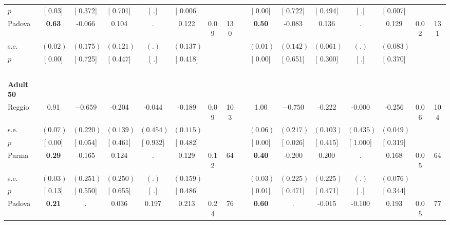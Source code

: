 \begin{longtable}{L{8em} c c c c c c c p{1em} c c c c c c c}
\quad \quad \quad \quad $ p$ & [     0.03] & [    0.372] & [    0.701] & [        .] & [    0.006] & & & & [     0.00] & [    0.722] & [    0.494] & [        .] & [    0.007] & &  \\[1em]
\quad \quad \quad Padova& \textbf{     0.63} &    -0.066 &     0.104 &         . &     0.122 &      0.09 &       130 & & \textbf{     0.50} &    -0.083 &     0.136 &         . &     0.129 &      0.02 &       131  \\*
\quad \quad \quad \quad s.e.& $ (     0.02)$ & $ (    0.175)$ & $ (    0.121)$ & $ (        .)$ & $ (    0.137)$ & & & & $ (     0.01)$ & $ (    0.142)$ & $ (    0.061)$ & $ (        .)$ & $ (    0.083)$ & &  \\*
\quad \quad \quad \quad $ p$ & [     0.00] & [    0.725] & [    0.447] & [        .] & [    0.418] & & & & [     0.00] & [    0.651] & [    0.300] & [        .] & [    0.370] & &  \\[1em]
~\\[1em]
\quad \quad \textbf{Adult 50} & & & & & & & & & & & & & & & \\* 
\quad \quad \quad Reggio& 0.91 & $ \mathbf{   -0.659}$ &    -0.204 &    -0.044 &    -0.189 &      0.09 &       103 & & 1.00 & $ \mathbf{   -0.750}$ &    -0.222 &    -0.000 &    -0.256 &      0.06 &       104  \\*
\quad \quad \quad \quad s.e.& $ (     0.07)$ & $ (    0.220)$ & $ (    0.139)$ & $ (    0.454)$ & $ (    0.115)$ & & & & $ (     0.06)$ & $ (    0.217)$ & $ (    0.103)$ & $ (    0.435)$ & $ (    0.049)$ & &  \\*
\quad \quad \quad \quad $ p$ & [     0.00] & [    0.054] & [    0.461] & [    0.932] & [    0.482] & & & & [     0.00] & [    0.026] & [    0.415] & [    1.000] & [    0.319] & &  \\[1em]
\quad \quad \quad Parma& \textbf{     0.29} &    -0.165 &     0.124 &         . &     0.129 &      0.12 &        64 & & \textbf{     0.40} &    -0.200 &     0.200 &         . &     0.168 &      0.05 &        64  \\*
\quad \quad \quad \quad s.e.& $ (     0.03)$ & $ (    0.251)$ & $ (    0.250)$ & $ (        .)$ & $ (    0.159)$ & & & & $ (     0.03)$ & $ (    0.225)$ & $ (    0.225)$ & $ (        .)$ & $ (    0.076)$ & &  \\*
\quad \quad \quad \quad $ p$ & [     0.13] & [    0.550] & [    0.655] & [        .] & [    0.486] & & & & [     0.01] & [    0.471] & [    0.471] & [        .] & [    0.344] & &  \\[1em]
\quad \quad \quad Padova& \textbf{     0.21} &         . &     0.036 &     0.197 &     0.213 &      0.24 &        76 & & \textbf{     0.60} &         . &    -0.015 &    -0.100 &     0.193 &      0.05 &        77  \\*

\end{longtable}
